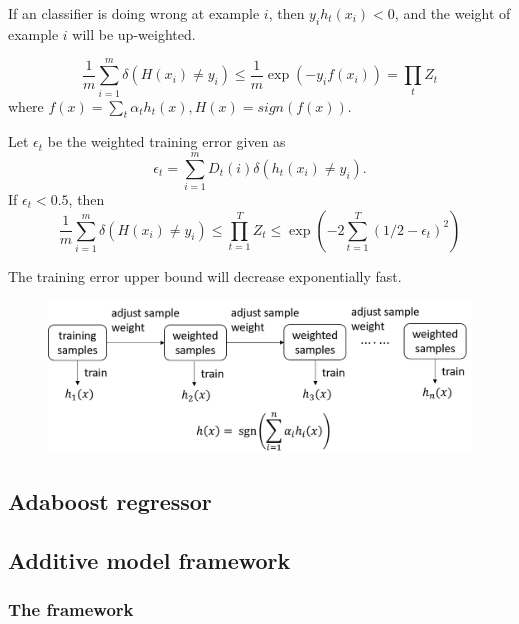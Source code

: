 \begin{refsection}
\begin{remark}
	If an classifier is doing wrong at example $i$, then $y_i h_t(x_i) < 0$, and the weight of example $i$ will be up-weighted.
\end{remark}



\begin{lemma}
$$\frac{1}{m}\sum_{i=1}^m \delta(H(x_i)\neq y_i) \leq \frac{1}{m}\exp(-y_i f(x_i)) = \prod_t Z_t$$
where $f(x) = \sum_t \alpha_t h_t(x), H(x) = sign(f(x)).$

Let $\epsilon_t$ be the weighted training error given as
$$\epsilon_t = \sum_{i=1}^m D_t(i) \delta(h_t(x_i) \neq y_i).$$
If $\epsilon_t < 0.5$, then
$$\frac{1}{m}\sum_{i=1}^m \delta(H(x_i)\neq y_i) \leq  \prod_{t=1}^T Z_t \leq \exp(-2\sum_{t=1}^T(1/2 - \epsilon_t)^2)$$
\end{lemma}


\begin{remark}[interpretation]
The training error upper bound will decrease exponentially fast.
\end{remark}


\begin{figure}[H]
	\centering
	\includegraphics[width=1\linewidth]{../figures/statisticalLearning/ensembleMethods/boostingLearningScheme}
	\caption{}
	\label{fig:boostinglearningscheme}
\end{figure}


\subsection{Adaboost regressor}



\subsection{Additive model framework}

\subsubsection{The framework}


\end{refsection}
